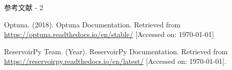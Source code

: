 \begin{frame}{参考文献 - 2}
    \begin{thebibliography}{99}    
        Optuna. (2018). Optuna Documentation. Retrieved from \url{https://optuna.readthedocs.io/en/stable/} [Accessed on: \today]

        ReservoirPy Team. (Year). ReservoirPy Documentation. Retrieved from \url{https://reservoirpy.readthedocs.io/en/latest/} [Accessed on: \today].

    \end{thebibliography}
\end{frame}
